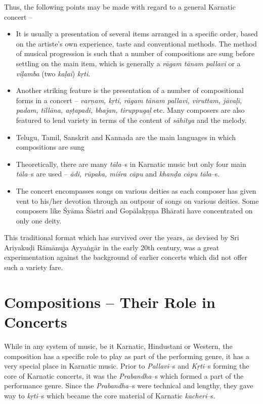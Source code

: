 Thus, the following points may be made with regard to a general Karnatic concert –

\begin{itemize}
\item It is usually a presentation of several items arranged in a specific order, based on the artiste’s own experience, taste and conventional methods. The method of musical progression is such that a number of compositions are sung before settling on the main item, which is generally a \textit{rāgam tānam pallavi} or a \textit{viḷamba} (two \textit{kaḷai}) \textit{kṛti}.

 \item Another striking feature is the presentation of a number of compositional forms in a concert – \textit{varṇam, kṛti, rāgam tānam pallavi, viruttam, jāvaḷi, padam, tillāna, aṣṭapadi, bhajan, tiruppugaḻ} etc. Many composers are also featured to lend variety in terms of the content of \textit{sāhitya} and the melody.

 \item Telugu, Tamil, Sanskrit and Kannada are the main languages in which compositions are sung

 \item Theoretically, there are many \textit{tāla}–s in Karnatic music but only four main \textit{tāla}–s are used – \textit{ādi, rūpaka, miśra cāpu} and \textit{khanḍa cāpu tāla}–s.

 \item The concert encompasses songs on various deities as each composer has given vent to his/her devotion through an outpour of songs on various deities. Some composers like Śyāma Śāstri and Gopālakṛṣṇa Bhārati have concentrated on only one deity.

\end{itemize}

This traditional format which has survived over the years, as devised by Sri Ariyakuḍi Rāmānuja Ayyaṅgār in the early 20th century, was a great experimentation against the background of earlier concerts which did not offer such a variety fare.


\section*{Compositions – Their Role in Concerts}

While in any system of music, be it Karnatic, Hindustani or Western, the composition has a specific role to play as part of the performing genre, it has a very special place in Karnatic music. Prior to \textit{Pallavi}–s and \textit{Kṛti}–s forming the core of Karnatic concerts, it was the \textit{Prabandha}–s which formed a part of the performance genre. Since the \textit{Prabandha}–s were technical and lengthy, they gave way to \textit{kṛti}–s which became the core material of Karnatic \textit{kacheri}–s.

